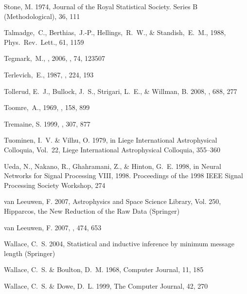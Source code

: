 \begin{thebibliography}{99}
{Stone}, M. 1974, Journal of the Royal Statistical Society. Series B
  (Methodological), 36, 111

  Talmadge,~C., Berthias,~J.-P., Hellings,~R.~W., \& Standish,~E.~M., 1988,
  Phys.~Rev.~Lett., 61, 1159

  Tegmark,~M., \etal, 2006, \prd, 74, 123507

  Terlevich,~E., 1987,
  \mnras, 224, 193

{Tollerud}, E.~J., {Bullock}, J.~S., {Strigari}, L.~E., \& {Willman}, B. 2008,
  \apj, 688, 277

  Toomre,~A., 1969,
  \apj, 158, 899

{Tremaine}, S. 1999, \mnras, 307, 877

{Tuominen}, I.~V. \& {Vilhu}, O. 1979, in Liege International Astrophysical
  Colloquia, Vol.~22, Liege International Astrophysical Colloquia, 355--360

{Ueda}, N., {Nakano}, R., {Ghahramani}, Z., \& {Hinton}, G.~E. 1998, in {Neural
  Networks for Signal Processing VIII, 1998. Proceedings of the 1998 IEEE
  Signal Processing Society Workshop}, 274

{van Leeuwen}, F. 2007{}, Astrophysics and Space Science Library,
  Vol. 250, {Hipparcos, the New Reduction of the Raw Data} ({Springer})

{van Leeuwen}, F. 2007{}, \aap, 474, 653

{Wallace}, C.~S. 2004, {Statistical and inductive inference by minimum message
  length} ({Springer})

{Wallace}, C.~S. \& {Boulton}, D.~M. 1968, {Computer Journal}, 11, 185

{Wallace}, C.~S. \& {Dowe}, D.~L. 1999, {The Computer Journal}, 42, 270


\end{thebibliography}

